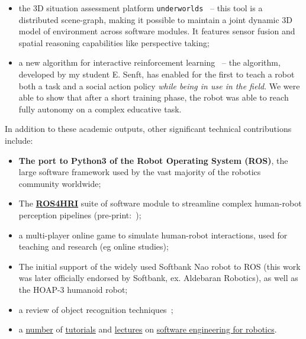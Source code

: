 \begin{itemize}
    \item the 3D situation assessment platform
        \texttt{underworlds}~\autocite{lemaignan2018underworlds} -- this tool
        is a distributed scene-graph, making it possible to maintain a joint
        dynamic 3D model of environment across software modules. It features
        sensor fusion and spatial reasoning capabilities like perspective
        taking;

    \item a new algorithm for interactive reinforcement
        learning~\autocite{senft2017supervised} -- the algorithm, developed by
        my student E. Senft, has enabled for the first to teach a robot both a
        task and a social action policy \emph{while being in use in the field}.
        We were able to show that after a short training phase, the robot was
        able to reach fully autonomy on a complex educative task.
\end{itemize}


\vspace{2em}

In addition to these academic outputs, other significant technical contributions
include:

\begin{itemize}
    \item \textbf{The port to Python3 of the Robot Operating System (ROS)}, the large
        software framework used by the vast majority of the robotics community
        worldwide;
    \item The \href{https://github.com/ros4hri/ros4hri}{\textbf{ROS4HRI}}
        suite of software module to streamline complex human-robot perception
        pipelines (pre-print:~\cite{mohamed2020ros});
    \item a multi-player online game to simulate human-robot interactions, used
        for teaching and research (eg online studies);
    \item The initial support of the widely used Softbank Nao robot to ROS (this
        work was later officially endorsed by Softbank, ex. Aldebaran Robotics),
        as well as the HOAP-3 humanoid robot;
    \item a review of object recognition
        techniques~\autocite{wallbridge2017qualitative};
    \item a         \href{https://github.com/severin-lemaignan/lecture-software-engineering}{number} of
        \href{https://github.com/severin-lemaignan/lecture-intro-programming-for-robotics}{tutorials}
        and \href{https://github.com/severin-lemaignan/git-presentation}{lectures} on \href{https://github.com/severin-lemaignan/ros-presentation}{software engineering for
        robotics}.
\end{itemize}



